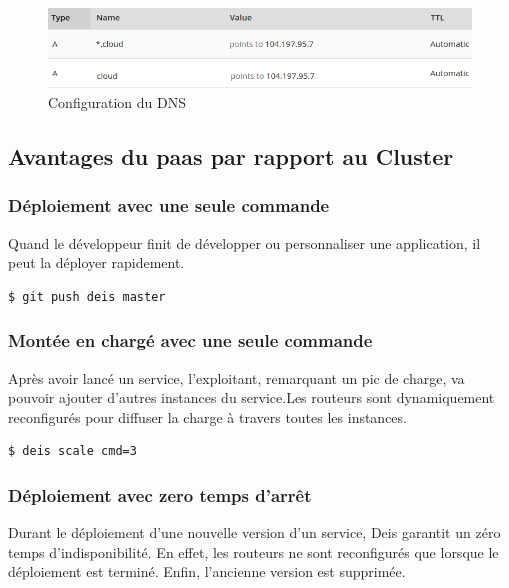 \begin{onehalfspace}
\begin{figure}[H]
\centering
\includegraphics [scale=0.55]{chapitre5/assets/dns}
\caption{Configuration du DNS}
\label{fig:dns}
\end{figure}


\subsection{Avantages du \acrshort{paas} par rapport au Cluster}

\subsubsection*{Déploiement avec une seule commande}

	Quand le développeur finit de développer ou personnaliser une application, il peut la déployer rapidement.

	\begin{lstlisting}[language=bash,caption=Déploiement avec Deis]
		$ git push deis master
	\end{lstlisting}

\subsubsection*{Montée en chargé avec une seule commande}

Après avoir lancé un service, l'exploitant, remarquant un pic de charge, va pouvoir ajouter d'autres instances du service.Les routeurs sont dynamiquement reconfigurés pour diffuser la charge à travers toutes les instances.

	\begin{lstlisting}[language=bash,caption=Montée en charge]
		$ deis scale cmd=3
	\end{lstlisting}

\subsubsection*{Déploiement avec zero temps d'arrêt}

Durant le déploiement d'une nouvelle version d'un service, Deis garantit un zéro temps d'indisponibilité. En effet, les routeurs ne sont reconfigurés que lorsque le déploiement est terminé. Enfin, l'ancienne version est supprimée.








\end{onehalfspace}
